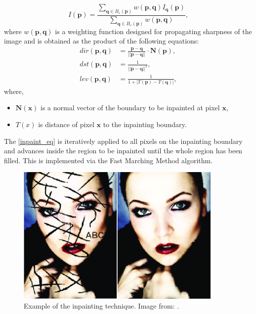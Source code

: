 \documentclass[twoside]{ctuthesis}
\theoremstyle{plain}
\theoremstyle{definition}
\theoremstyle{note}
\begin{document}
\begin{equation}\label{inpaint_eq}
	I(\mathbf{p})=\frac{\sum_{\mathbf{q}\in B_{\varepsilon}(\mathbf{p})}w(\mathbf{p},\mathbf{q})I_{\mathbf{q}}(\mathbf{p})}{\sum_{\mathbf{q}\in B_{\varepsilon}(\mathbf{p})}w(\mathbf{p},\mathbf{q})},
\end{equation}
where $w(\mathbf{p},\mathbf{q})$ is a weighting function designed for propagating sharpness of the image and is obtained as the product of the following equations:
\begin{equation}
	\begin{aligned}
		dir(\mathbf{p},\mathbf{q})&=\frac{\mathbf{p}-\mathbf{q}}{||\mathbf{p}-\mathbf{q}||}\cdot\mathbf{N(p)},\\
		dst(\mathbf{p},\mathbf{q})&=\frac{1}{||\mathbf{p}-\mathbf{q}||^2},\\
		lev(\mathbf{p},\mathbf{q})&=\frac{1}{1+|T(\mathbf{p})-T(\mathbf{q})|},
	\end{aligned}
\end{equation}
where,
\begin{itemize}
	\item $\mathbf{N(x)}$ is a normal vector of the boundary to be inpainted at pixel $\mathbf{x}$,
	\item $T(x)$ is distance of pixel $\mathbf{x}$ to the inpainting boundary.
\end{itemize}
The \eqref{inpaint_eq} is iteratively applied to all pixels on the inpainting boundary and advances inside the region to be inpainted until the whole region has been filled. This is implemented via the Fast Marching Method algorithm.
\begin{figure}
	\caption{Example of the inpainting technique. Image from: \cite{cite:5}.}
	\includegraphics[width=10cm]{inpaint_example.png}
	\centering
\end{figure}
\end{document}
